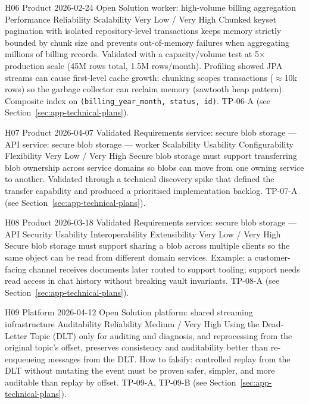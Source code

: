 \hypoboxnine%
  {H06}%
  {Product}%
  {2026-02-24}%
  {Open}%
  {Solution}%
  {worker: high-volume billing aggregation}%
  {Performance \textbar{} Reliability \textbar{} Scalability}%
  {Very Low / Very High}%
  {Chunked keyset pagination with isolated repository-level transactions keeps
   memory strictly bounded by chunk size and prevents out-of-memory failures when
   aggregating millions of billing records.}%
\hypoboxtail%
  {Validated with a capacity/volume test at 5$\times$ production scale (45M rows
   total, 1.5M rows/month). Profiling showed JPA streams can cause first-level
   cache growth; chunking scopes transactions ($\approx$10k rows) so the garbage
   collector can reclaim memory (sawtooth heap pattern). Composite index on
   \texttt{(billing\_year\_month, status, id)}.}%
  {TP-06-A (see Section~\ref{sec:app-technical-plans}).}

\hypoboxnine%
  {H07}%
  {Product}%
  {2026-04-07}%
  {Validated}%
  {Requirements}%
  {service: secure blob storage — API \textbar{} service: secure blob storage — worker}%
  {Scalability \textbar{} Usability \textbar{} Configurability \textbar{} Flexibility}%
  {Very Low / Very High}%
  {Secure blob storage must support transferring blob ownership across service
   domains so blobs can move from one owning service to another.}%
\hypoboxtail%
  {Validated through a technical discovery spike that defined the transfer
   capability and produced a prioritised implementation backlog.}%
  {TP-07-A (see Section~\ref{sec:app-technical-plans}).}

\hypoboxnine%
  {H08}%
  {Product}%
  {2026-03-18}%
  {Validated}%
  {Requirements}%
  {service: secure blob storage — API}%
  {Security \textbar{} Usability \textbar{} Interoperability \textbar{} Extensibility}%
  {Very Low / Very High}%
  {Secure blob storage must support sharing a blob across multiple clients so the
   same object can be read from different domain services.}%
\hypoboxtail%
  {Example: a customer-facing channel receives documents later routed to support
   tooling; support needs read access in chat history without breaking vault
   invariants.}%
  {TP-08-A (see Section~\ref{sec:app-technical-plans}).}

\hypoboxnine%
  {H09}%
  {Platform}%
  {2026-04-12}%
  {Open}%
  {Solution}%
  {platform: shared streaming infrastructure}%
  {Auditability \textbar{} Reliability}%
  {Medium / Very High}%
  {Using the Dead-Letter Topic (DLT) only for auditing and diagnosis, and
   reprocessing from the original topic's offset, preserves consistency and
   auditability better than re-enqueueing messages from the DLT.}%
\hypoboxtail%
  {How to falsify: controlled replay from the DLT without mutating the event must
   be proven safer, simpler, and more auditable than replay by offset.}%
  {TP-09-A, TP-09-B (see Section~\ref{sec:app-technical-plans}).}

